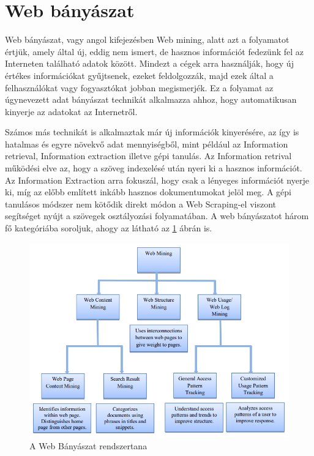 \section{Web bányászat}

Web bányászat, vagy angol kifejezésben Web mining, alatt azt a folyamatot értjük, amely által új, eddig nem ismert, de hasznos információt fedezünk fel az Interneten található adatok között. Mindezt a cégek arra használják, hogy új értékes információkat gyűjtsenek, ezeket feldolgozzák, majd ezek által a felhasználókat vagy fogyasztókat jobban megismerjék. Ez a folyamat az úgynevezett adat bányászat technikát alkalmazza ahhoz, hogy automatikusan kinyerje az adatokat az Internetről\cite{gorunescu2011data}. 

Számos más technikát is alkalmaztak már új információk kinyerésére, az így is hatalmas és egyre növekvő adat mennyiségből, mint például az Information retrieval, Information extraction illetve gépi tanulás. Az Information retrival működési elve az, hogy a szöveg indexelésé után nyeri ki a hasznos információt. Az Information Extraction arra fokuszál, hogy csak a lényeges információt nyerje ki, míg az előbb említett inkább hasznos dokumentumokat jelöl meg. A gépi tanulásos módszer nem kötődik direkt módon a Web Scraping-el viszont segítséget nyújt a szövegek osztályozási folyamatában. A web bányászatot három fő kategóriába soroljuk, ahogy az látható az \ref{fig:web_mining_rendszertana} ábrán is.

\begin{figure}[h]
    \centering
    \includegraphics[scale=1, width=\textwidth]{figures/images/web_mining_rendszertan.png}
    \caption{A Web Bányászat rendszertana \cite{johnson2012web}}
    \label{fig:web_mining_rendszertana}
\end{figure}

